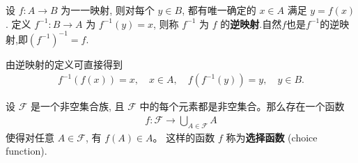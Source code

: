 \documentclass[../../main.tex]{subfiles}%
\begin{document}
\begin{definition}[逆映射]
设 $f : A \to B$ 为一一映射, 则对每个 $y \in B$, 都有唯一确定的 $x \in A$ 满足 $y = f(x)$. 定义 $f^{-1} : B \to A$ 为 $f^{-1}(y) = x$, 则称 $f^{-1}$ 为 $f$ 的\textbf{逆映射}.自然$f$也是$f^{-1}$的逆映射,即$(f^{-1})^{-1}=f.$
\end{definition}
\begin{note}
由逆映射的定义可直接得到
\begin{align*}
f^{-1}(f(x)) = x, \quad x \in A,\quad
f(f^{-1}(y)) = y, \quad y \in B.
\end{align*} 
\end{note}

\begin{axiom}[选择公理(AC)]\label{axiom:选择公理}
设 $\mathcal{F}$ 是一个非空集合族, 且 $\mathcal{F}$ 中的每个元素都是非空集合。那么存在一个函数
\begin{align*}
f : \mathcal{F} \to \bigcup_{A\in\mathcal{F}} A
\end{align*}
使得对任意 $A \in \mathcal{F}$, 有 $f(A) \in A$。
这样的函数 $f$ 称为\textbf{选择函数} (choice function).
\end{axiom}
\end{document}
